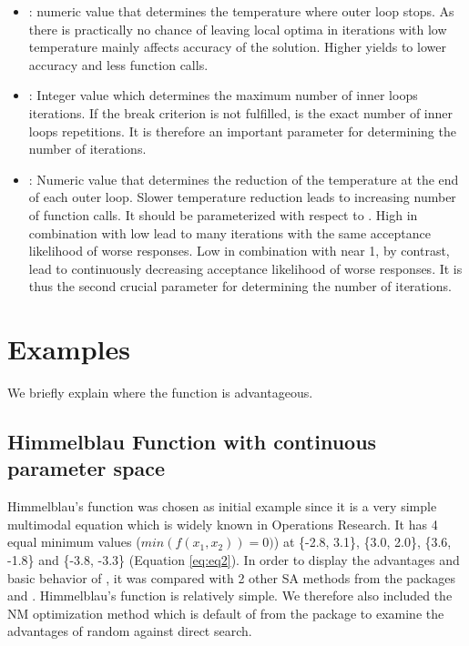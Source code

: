 \begin{itemize}
	\item {}: numeric value that determines the temperature where outer loop stops. As there is practically no chance of leaving local optima in iterations with low temperature  mainly affects accuracy of the solution. Higher  yields to lower accuracy and less function calls.
	\item {}: Integer value which determines the maximum number of inner loops iterations. If the break criterion  is not fulfilled,  is the exact number of inner loops repetitions. It is therefore an important parameter for determining the number of iterations.
	\item {}: Numeric value that determines the reduction of the temperature at the end of each outer loop. Slower temperature reduction leads to increasing number of function calls. It should be parameterized with respect to . High  in combination with low  lead to many iterations with the same acceptance likelihood of worse responses. Low  in combination with  near 1, by contrast, lead to continuously decreasing acceptance likelihood of worse responses. It is thus the second crucial parameter for determining the number of iterations.
\end{itemize}

\section{Examples}
We briefly explain where the  function is advantageous.

\subsection{Himmelblau Function with continuous parameter space}
Himmelblau's function \citep{himmelblau_1972} was chosen as initial example since it is a very simple multimodal equation which is widely known in Operations Research. It has 4 equal minimum values ($min(f(x_1,x_2))=0)$) at \{-2.8, 3.1\}, \{3.0, 2.0\}, \{3.6, -1.8\} and \{-3.8, -3.3\} (Equation \ref{eq:eq2}). In order to display the advantages and basic behavior of , it was compared with 2 other SA methods from the packages  and . Himmelblau's function is relatively simple. We therefore also included the NM optimization method \citep{nelder_1965} which is default of  from the  package to examine the advantages of random against direct search.

